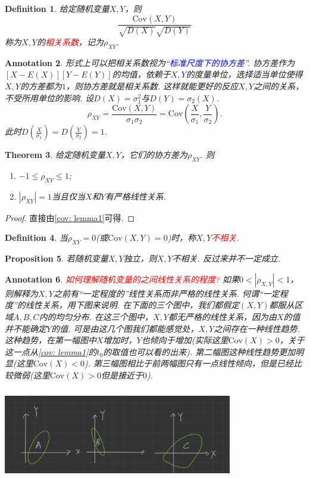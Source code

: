 \documentclass{article}
\newtheorem{theorem}{Theorem}[section]
\newtheorem{proposition}[theorem]{Proposition}
\newtheorem{definition}[theorem]{Definition}
\newtheorem{annotation}[theorem]{Annotation}
\newcommand{\redt}[1]{\textcolor{red}{#1}}
\newcommand{\bluet}[1]{\textcolor{blue}{#1}}
\begin{document}
\begin{definition}
\rm 给定随机变量$X,Y$，则
$$
\frac{\text{Cov}(X,Y)}{\sqrt{D(X)}\sqrt{D(Y)}}
$$
称为$X,Y$的\redt{相关系数}，记为$\rho_{XY}$.
\end{definition}

\begin{annotation}
\rm 形式上可以把相关系数视为“\bluet{标准尺度下的协方差}”. 协方差作为$[X-E(X)][Y-E(Y)]$的均值，依赖于$X,Y$的度量单位，选择适当单位使得$X,Y$的方差都为$1$，则协方差就是相关系数. 这样就能更好的反应$X,Y$之间的关系，不受所用单位的影响. 设$D(X)=\sigma_1^2$与$D(Y)=\sigma_2(X)$.
$$
\rho_{XY}=\frac{\text{Cov}(X,Y)}{\sigma_1\sigma_2} = \text{Cov}(\frac{X}{\sigma_1},\frac{Y}{\sigma_2}).
$$
此时$D(\frac{X}{\sigma_1})=D(\frac{Y}{\sigma_2}) = 1$.
\end{annotation}

\begin{theorem}
\rm 给定随机变量$X,Y$，它们的协方差为$\rho_{XY}$. 则
\begin{enumerate}
	\item $ -1 \leq \rho_{XY} \leq 1$;
	\item $|\rho_{XY}| = 1$当且仅当$X$和$Y$有严格线性关系. 
\end{enumerate} 
\end{theorem}

\begin{proof}
直接由\ref{cov: lemma1}可得.
\end{proof}

\begin{definition}
\rm 当$\rho_{XY}=0$(或$\text{Cov}(X,Y)=0$)时，称$X,Y$\redt{不相关}.
\end{definition}

\begin{proposition}
\rm 若随机变量$X,Y$独立，则$X,Y$不相关. 反过来并不一定成立. 
\end{proposition}

\begin{annotation}
\rm \redt{如何理解随机变量的之间线性关系的程度?} 如果$0 < |\rho_{X,Y}| < 1$，则解释为$X,Y$之前有“一定程度的”线性关系而非严格的线性关系. 何谓“一定程度”的线性关系，用下图来说明. 在下面的三个图中，我们都假定$(X,Y)$都服从区域$A,B,C$内的均匀分布. 在这三个图中，$X,Y$都无严格的线性关系，因为由$X$的值并不能确定$Y$的值. 可是由这几个图我们都能感觉处，$X,Y$之间存在一种线性趋势. 这种趋势，在第一幅图中$X$增加时，$Y$也倾向于增加(实际这里$\text{Cov}(X)>0$，关于这一点从\ref{cov: lemma1}的$t_0$的取值也可以看的出来). 第二幅图这种线性趋势更加明显(这里$\text{Cov}(X) < 0$). 第三幅图相比于前两幅图只有一点线性倾向，但是已经比较微弱(这里$\text{Cov}(X)>0$但是接近于$0$). 
\begin{center}
\includegraphics[width=10cm, height=4cm]{images/covariance.jpg}
\end{center}
\end{annotation}
\end{document}
